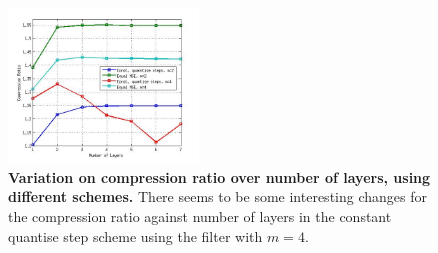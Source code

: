 \documentclass[a4paper, 11pt]{article}
\begin{document}
\begin{center}
\begin{figure}[h]
\begin{center}
\includegraphics[width=0.45\textwidth]{compress_ratio.jpg}
\caption{\textbf{Variation on compression ratio over number of layers, using different schemes.} There seems to be some interesting changes for the compression ratio against number of layers in the constant quantise step scheme using the filter with $m = 4$.}
\end{center}
\end{figure}
\end{center}
\end{document}
